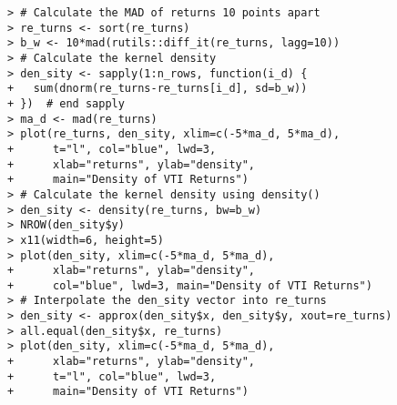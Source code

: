 \documentclass[10pt]{beamer}\usepackage[]{graphicx}\usepackage[]{color}
\makeatletter
\newenvironment{kframe}{%
 \def\at@end@of@kframe{}%
 \ifinner\ifhmode%
  \def\at@end@of@kframe{\end{minipage}}%
  \begin{minipage}{\columnwidth}%
 \fi\fi%
 \def\FrameCommand##1{\hskip\@totalleftmargin \hskip-\fboxsep
 \colorbox{shadecolor}{##1}\hskip-\fboxsep
     \hskip-\linewidth \hskip-\@totalleftmargin \hskip\columnwidth}%
 \MakeFramed {\advance\hsize-\width
   \@totalleftmargin\z@ \linewidth\hsize
   \@setminipage}}%
 {\par\unskip\endMakeFramed%
 \at@end@of@kframe}
\newenvironment{knitrout}{}{} %
\makeatother
\begin{document}
\begin{frame}[fragile,t]{\subsecname}
\begin{block}{}
\begin{columns}[T]
\begin{knitrout}
\begin{kframe}
\begin{verbatim}
> # Calculate the MAD of returns 10 points apart
> re_turns <- sort(re_turns)
> b_w <- 10*mad(rutils::diff_it(re_turns, lagg=10))
> # Calculate the kernel density
> den_sity <- sapply(1:n_rows, function(i_d) {
+   sum(dnorm(re_turns-re_turns[i_d], sd=b_w))
+ })  # end sapply
> ma_d <- mad(re_turns)
> plot(re_turns, den_sity, xlim=c(-5*ma_d, 5*ma_d),
+      t="l", col="blue", lwd=3,
+      xlab="returns", ylab="density",
+      main="Density of VTI Returns")
> # Calculate the kernel density using density()
> den_sity <- density(re_turns, bw=b_w)
> NROW(den_sity$y)
> x11(width=6, height=5)
> plot(den_sity, xlim=c(-5*ma_d, 5*ma_d),
+      xlab="returns", ylab="density",
+      col="blue", lwd=3, main="Density of VTI Returns")
> # Interpolate the den_sity vector into re_turns
> den_sity <- approx(den_sity$x, den_sity$y, xout=re_turns)
> all.equal(den_sity$x, re_turns)
> plot(den_sity, xlim=c(-5*ma_d, 5*ma_d),
+      xlab="returns", ylab="density",
+      t="l", col="blue", lwd=3,
+      main="Density of VTI Returns")
\end{verbatim}
\end{kframe}
\end{knitrout}
  \end{columns}
\end{block}

\end{frame}


\end{document}
